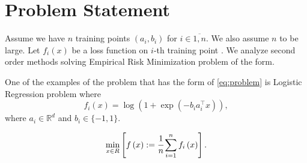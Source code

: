 \documentclass{article}
\begin{document}
\section{Problem Statement}

Assume we have $n$ training points $\left(a_i, b_i\right)$ for $i \in \overline{1, n}$. We also assume $n$ to be large. Let $f_i\left(x\right)$ be a loss function on $i$-th training point . We analyze second order methods solving Empirical Risk Minimization problem of the form.

One of the examples of the problem that has the form of \eqref{eq:problem} is Logistic Regression problem where
\begin{equation}
    f_i(x) = \log\left(1+\exp(-b_i a_i^\top x )\right),
\end{equation}
where $a_i \in \mathbb{R}^d$ and $b_i \in \{-1,1\}.$


\begin{equation}
    \min\limits_{x\in R} \left[f\left(x\right):=\cfrac{1}{n}\sum\limits_{i=1}^{n}f_i\left(x\right)\right].
\end{equation}
\newpage
{}

\printbibliography
\end{document}
